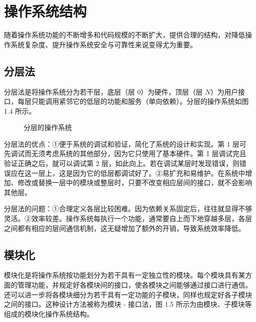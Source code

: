 \documentclass{ctexbook}
\begin{document}
	\section{操作系统结构}
	随着操作系统功能的不断增多和代码规模的不断扩大，提供合理的结构，对降低操作系统复杂度、提升操作系统安全与可靠性来说变得尤为重要。
	
	\subsection{分层法}
	分层法是将操作系统分为若干层，底层（层 0）为硬件，顶层（层 \(N\)）为用户接口，每层只能调用紧邻它的低层的功能和服务（单向依赖）。分层的操作系统如图 1.4 所示。
	
	\begin{figure}[h]
		\centering
		\caption{分层的操作系统}
	\end{figure}
		
		分层法的优点：①便于系统的调试和验证，简化了系统的设计和实现。第 1 层可先调试而无须考虑系统的其他部分，因为它只使用了基本硬件。第 1 层调试完且验证正确之后，就可以调试第 2 层，如此向上。若在调试某层时发现错误，则错误应在这一层上，这是因为它的低层都调试好了。②易扩充和易维护。在系统中增加、修改或替换一层中的模块或整层时，只要不改变相应层间的接口，就不会影响其他层。
		
		分层法的问题：①合理定义各层比较困难。因为依赖关系固定后，往往就显得不够灵活。②效率较差。操作系统每执行一个功能，通常要自上而下地穿越多层，各层之间都有相应的层间通信机制，这无疑增加了额外的开销，导致系统效率降低。
		
		\subsection{模块化}
		模块化是将操作系统按功能划分为若干具有一定独立性的模块。每个模块具有某方面的管理功能，并规定好各模块间的接口，使各模块之间能够通过接口进行通信。还可以进一步将各模块细分为若干具有一定功能的子模块，同样也规定好各子模块之间的接口。这种设计方法被称为模块 - 接口法，图 1.5 所示为由模块、子模块等组成的模块化操作系统结构。
		
\end{document}
